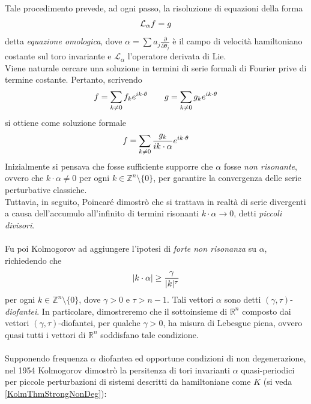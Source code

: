 \documentclass[twoside, 11pt]{amsbook}
\newcommand{\0}{{(0)}}
\newcommand{\3}{{(3)}}
\theoremstyle{colonplain}
\theoremstyle{colondefinition}
\theoremstyle{colonremark}
\numberwithin{equation}{chapter}
\begin{document}
Tale procedimento prevede, ad ogni passo, la risoluzione di equazioni della forma
\begin{align}
    \mathcal{L}_\alpha f = g \notag 
\end{align}
detta \textit{equazione omologica}, dove $\alpha = \sum a_j\frac{\partial}{\partial \theta_j}$ è il campo di velocità hamiltoniano costante sul toro invariante e $\mathcal{L}_\alpha$ l'operatore derivata di Lie. \\ 
Viene naturale cercare una soluzione in termini di serie formali di Fourier prive di termine costante. Pertanto, scrivendo
\begin{align}
    f = \sum_{k \neq 0} f_k e^{ik \cdot \theta} \qquad g = \sum_{k \neq 0} g_k e^{ik \cdot \theta} \notag 
\end{align}
si ottiene come soluzione formale
\begin{align}
    f = \sum_{k \neq 0} \frac{g_k}{ik \cdot \alpha} e^{ik \cdot \theta} \notag 
\end{align}
Inizialmente si pensava che fosse sufficiente supporre che $\alpha$ fosse \textit{non risonante}, ovvero che $k \cdot \alpha \neq 0$ per ogni $k \in \mathbb{Z}^n \setminus \{0\}$, per garantire la convergenza delle serie perturbative classiche. \\
Tuttavia, in seguito, Poincaré dimostrò che si trattava in realtà di serie divergenti a causa dell'accumulo all'infinito di termini risonanti $k \cdot \alpha \rightarrow 0$, detti \textit{piccoli divisori}. \\ \\
Fu poi Kolmogorov ad aggiungere l'ipotesi di \textit{forte non risonanza} su $\alpha$, richiedendo che
\begin{align}
    |k \cdot \alpha| \geq \frac{\gamma}{|k|^\tau} \notag
\end{align}
per ogni $k \in \mathbb{Z}^n \setminus \{0\}$, dove $\gamma > 0$ e $\tau > n - 1$. Tali vettori $\alpha$ sono detti $(\gamma, \tau)$-\textit{diofantei}. In particolare, dimostreremo che il sottoinsieme di $\mathbb{R}^n$ composto dai vettori $(\gamma, \tau)$-diofantei, per qualche $\gamma > 0$, ha misura di Lebesgue piena, ovvero quasi tutti i vettori di $\mathbb{R}^n$ soddisfano tale condizione. \\ \\
Supponendo frequenza $\alpha$ diofantea ed opportune condizioni di non degenerazione, nel 1954 Kolmogorov dimostrò la persitenza di tori invarianti $\alpha$ quasi-periodici per piccole perturbazioni di sistemi descritti da hamiltoniane come $K$ (si veda \ref{KolmThmStrongNonDeg}):
\end{document}
